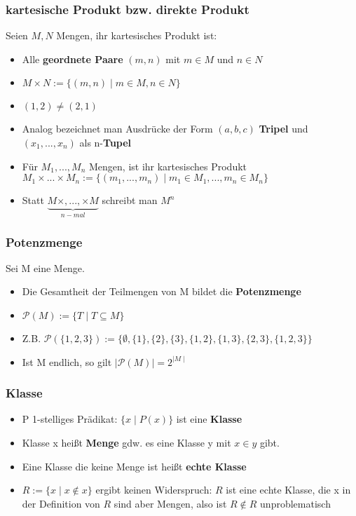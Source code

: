\documentclass[titlepage]{article}
\newcommand{\1}{\mathbb{1}}
\newcommand{\0}{\mathbb{0}}
\begin{document}
				\subsubsection{kartesische Produkt bzw. direkte Produkt}
				Seien $M,N$ Mengen, ihr kartesisches Produkt ist:
					\begin{itemize}
						\item Alle \textbf{geordnete Paare} $(m,n)$ mit $m\in M$ und $n\in N$
						\item $M\times N:=\{(m,n)\mid m\in M,n\in N\}$
						\item $(1,2)\neq(2,1)$
						\item Analog bezeichnet man Ausdrücke der Form $(a,b,c)$ \textbf{Tripel} und $(x_1,...,x_n)$ als n-\textbf{Tupel}
						\item Für $M_1,...,M_n$ Mengen, ist ihr kartesisches Produkt $M_1\times...\times M_n:=\{(m_1,...,m_n)\mid m_1\in M_1,...,m_n\in M_n\}$
						\item Statt $\underbrace{M\times,...,\times M}_{n-mal}$ schreibt man $M^n$
					\end{itemize}
				\subsubsection{Potenzmenge}
					Sei M eine Menge.
					\begin{itemize}
						\item Die Gesamtheit der Teilmengen von M bildet die \textbf{Potenzmenge}
						\item $\mathscr{P}(M):=\{T\mid T\subseteq M\}$
						\item Z.B. $\mathscr{P}(\{1,2,3\}):=\{\emptyset,\{1\},\{2\},\{3\},\{1,2\},\{1,3\},\{2,3\},\{1,2,3\}\}$
						\item Ist M endlich, so gilt $\mid\mathscr{P}(M)\mid=2^{\mid M\mid}$
					\end{itemize}
				\subsubsection{Klasse}
					\begin{itemize}
						\item P 1-stelliges Prädikat: $\{x\mid P(x)\}$ ist eine \textbf{Klasse}
						\item Klasse x heißt \textbf{Menge} gdw. es eine Klasse y mit $x\in y$ gibt.
						\item Eine Klasse die keine Menge ist heißt \textbf{echte Klasse}
						\item $R:=\{x\mid x\notin x\}$ ergibt keinen Widerspruch: $R$ ist eine echte Klasse, die x in der Definition von $R$ sind aber Mengen, also ist $R\notin R$ unproblematisch
					\end{itemize}
\end{document}

